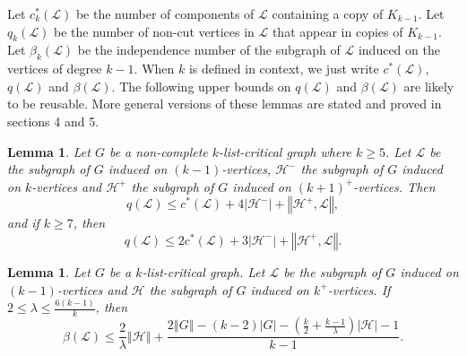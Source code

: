 \documentclass[10pt]{article}
\renewcommand{\ge}{\geqslant}
\renewcommand{\le}{\leqslant}
\theoremstyle{plain}
\newtheorem{lem}[thm]{Lemma}
\theoremstyle{definition}
\theoremstyle{remark}
\newcommand{\fancy}[1]{\mathcal{#1}}
\renewcommand{\L}{\fancy{L}}
\newcommand{\HH}{\fancy{H}}
\newcommand{\card}[1]{\left|#1\right|}
\newcommand{\size}[1]{\left\Vert#1\right\Vert}
\newcommand{\parens}[1]{\left( #1 \right)}
\begin{document}
Let $c_k^*(\L)$ be the number of components of $\L$ containing a copy of $K_{k-1}$. Let $q_k(\L)$ be the number of non-cut vertices in $\L$ that appear in copies of $K_{k-1}$.  
Let $\beta_k(\L)$ be the independence number of the subgraph of $\L$ induced on the vertices of degree $k-1$.  
When $k$ is defined in context, we just write $c^*(\L)$, $q(\L)$ and $\beta(\L)$.  
The following upper bounds on $q(\L)$ and $\beta(\L)$ are likely to be reusable.  More general versions of these lemmas are stated and proved in sections 4 and 5.

\begin{lem}\label{qLemmaList}
	Let $G$ be a non-complete $k$-list-critical graph where $k \ge 5$.  Let $\L$ be the subgraph of $G$ induced on $(k-1)$-vertices, $\HH^-$ the subgraph of $G$ induced on $k$-vertices
	and $\HH^+$ the subgraph of $G$ induced on $(k+1)^+$-vertices.  Then
	\[q(\L) \le c^*(\L) + 4\card{\HH^-} + \size{\HH^+, \L},\] and if $k \ge 7$, then
	\[q(\L) \le 2c^*(\L) + 3\card{\HH^-} + \size{\HH^+, \L}.\]
\end{lem}

\begin{lem}\label{betaLemmaList}
	Let $G$ be a $k$-list-critical graph.  Let $\L$ be the subgraph of $G$ induced on $(k-1)$-vertices and	$\HH$ the subgraph of $G$ induced on $k^+$-vertices.  
	If $2 \le \lambda \le \frac{6(k-1)}{k}$, then
	\[\beta(\L) \le \frac{2}{\lambda}\size{\HH} + \frac{2\size{G} - (k-2)\card{G} - \parens{\frac{k}{2} + \frac{k-1}{\lambda}}\card{\HH} - 1}{k-1}.\]
\end{lem}
\end{document}
